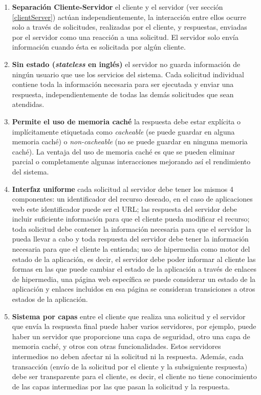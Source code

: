    \begin{enumerate}
        \item \textbf{Separación Cliente-Servidor} el cliente y el servidor (ver sección \ref{clientServer}) actúan independientemente, la interacción entre ellos ocurre solo a través de solicitudes, realizadas por el cliente, y respuestas, enviadas por el servidor como una reacción a una solicitud. El servidor solo envía información cuando ésta es solicitada por algún cliente.
        \item \textbf{Sin estado (\emph{stateless} en inglés)} el servidor no guarda información de ningún usuario que use los servicios del sistema. Cada solicitud individual contiene toda la información necesaria para ser ejecutada y enviar una respuesta, independientemente de todas las demás solicitudes que sean atendidas.
        \item \textbf{Permite el uso de memoria caché} la respuesta debe estar explícita o implícitamente etiquetada como \textit{cacheable} (se puede guardar en alguna memoria caché) o \textit{non-cacheable} (no se puede guardar en ninguna memoria caché). La ventaja del uso de memoria caché es que se pueden eliminar parcial o completamente algunas interacciones mejorando así el rendimiento del sistema.
        \item \textbf{Interfaz uniforme} cada solicitud al servidor debe tener los mismos 4 componentes: un identificador del recurso deseado, en el caso de aplicaciones web este identificador puede ser el URL; las respuesta del servidor debe incluir suficiente información para que el cliente pueda modificar el recurso; toda solicitud debe contener la información necesaria para que el servidor la pueda llevar a cabo y toda respuesta del servidor debe tener la información necesaria para que el cliente la entienda; uso de hipermedia como motor del estado de la aplicación, es decir, el servidor debe poder informar al cliente las formas en las que puede cambiar el estado de la aplicación a través de enlaces de hipermedia, una página web específica se puede considerar un estado de la aplicación y enlaces incluidos en esa página se consideran transiciones a otros estados de la aplicación.
        \item \textbf{Sistema por capas} entre el cliente que realiza una solicitud y el servidor que envía la respuesta final puede haber varios servidores, por ejemplo, puede haber un servidor que proporcione una capa de seguridad, otro una capa de memoria caché, y otros con otras funcionalidades. Estos servidores intermedios no deben afectar ni la solicitud ni la respuesta. Además, cada transacción (envío de la solicitud por el cliente y la subsiguiente respuesta) debe ser transparente para el cliente, es decir, el cliente no tiene conocimiento de las capas intermedias por las que pasan la solicitud y la respuesta.
    \end{enumerate}

